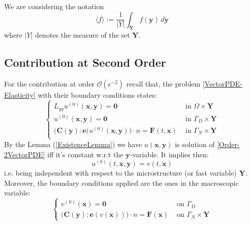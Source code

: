 \begin{rem}
We are considering the notation
\begin{equation*}
    \langle f \rangle := \frac{1}{\vert Y \vert} \int_{\mathbf{Y}} f(\mathbf{y}) \, d\mathbf{y}
\end{equation*}
where $\vert Y \vert$ denotes the measure of the set $\mathbf{Y}$.
\end{rem}

\subsection{Contribution at Second Order}
For the contribution at order $\mathcal{O}(\epsilon^{-2})$ recall that, the problem \ref{VectorPDE-Elasticity} with their boundary conditions states:
\begin{equation}
    \label{Order-2VectorPDE}
    \left \{
    \begin{array}{cc}
        L_{yy} u^{(0)}( \mathbf{x},\mathbf{y}) = \mathbf{0} & \text{ in } \Omega \times \mathbf{Y}\\
        u^{(0)} (\mathbf{x},\mathbf{y}) = \mathbf{0} & \text{ in } \Gamma_D \times \mathbf{Y} \\
        \big( \mathbf{C}(\mathbf{y}) :\mathbf{e}(u^{(0)}(\mathbf{x},\mathbf{y}) \big) \cdot n = \mathbf{F}(t, \mathbf{x}) & \text{ in } \Gamma_N \times \mathbf{Y} \\
    \end{array}
    \right .
\end{equation}
By the Lemma (\ref{ExistenceLemma}) we have $u(\mathbf{x},\mathbf{y})$ is solution of \ref{Order-2VectorPDE} iff it's constant w.r.t the $\mathbf{y}$-variable. It implies then:
\begin{equation}
    \label{IndepencyofY}
    u^{(0)}(t, \mathbf{x},\mathbf{y}) = v(t, \mathbf{x})
\end{equation}
i.e. being independent with respect to the microstructure (or fast variable) $\mathbf{Y}$. Moreover, the boundary conditions applied are the ones in the macroscopic variable:
\begin{equation*}
    \left \{
    \begin{array}{cc}
        v^{(0)}(\mathbf{x}) = \mathbf{0} & \text{ on } \Gamma_D\\
        \big(\mathbf{C}(\mathbf{y}):\mathbf{e}(v(\mathbf{x})) \big) \cdot n = \mathbf{F}(\mathbf{x}) & \text{ on } \Gamma_N \times \mathbf{Y}
    \end{array}
    \right .
\end{equation*}

